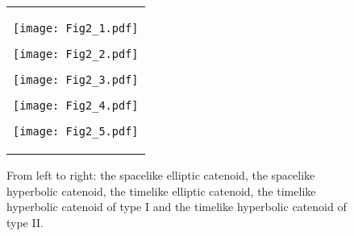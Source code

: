\documentclass[12pt,amstex]{amsart}%
\theoremstyle{plain} %
\theoremstyle{definition}
\begin{document}
\begin{figure}%
\begin{center}
\begin{tabular}{c}
\begin{minipage}{0.3\hsize}
\begin{center}
\vspace{-2.5cm}
\hspace{-0.8cm}
\texttt{[image: Fig2\_1.pdf]}
\end{center}
\end{minipage}
\hspace{-1.9cm}
\begin{minipage}{0.3\hsize}
\begin{center}
\vspace{-1.0cm}
\texttt{[image: Fig2\_2.pdf]}
\vspace{0.3cm}
\end{center}
\end{minipage}
\hspace{-1.0cm}
\begin{minipage}{0.3\hsize}
\begin{center}
\vspace{-0.5cm}
\texttt{[image: Fig2\_3.pdf]}
\vspace{0.5cm}
\end{center}
\end{minipage}
\hspace{-3.0cm}
\begin{minipage}{0.3\hsize}
\begin{center}
\vspace{-1.0cm}
\texttt{[image: Fig2\_4.pdf]}
\vspace{0.3cm}
\end{center}
\end{minipage}
\hspace{-1.3cm}
\begin{minipage}{0.3\hsize}
\begin{center}
\vspace{-0.8cm}
\texttt{[image: Fig2\_5.pdf]}
\vspace{0.5cm}
\end{center}
\end{minipage}

\end{tabular}
\end{center}
\vspace{-0.5cm}
\caption{From left to right: the spacelike elliptic catenoid, the spacelike hyperbolic catenoid, the timelike elliptic catenoid, the timelike hyperbolic catenoid of type I and the timelike hyperbolic catenoid of type II.}\label{Fig5_1}

\end{figure}
\end{document}
